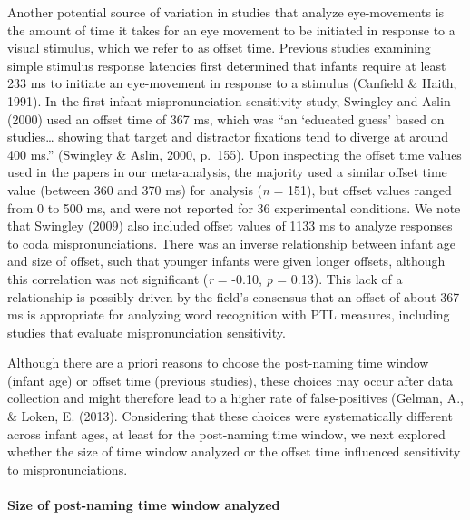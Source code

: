 \documentclass[man]{apa6}
\let\oldparagraph\paragraph
\renewcommand{\paragraph}[1]{\oldparagraph{#1}\mbox{}}
\theoremstyle{definition}
\theoremstyle{definition}
\theoremstyle{definition}
\theoremstyle{remark}
\begin{document}
Another potential source of variation in studies that analyze
eye-movements is the amount of time it takes for an eye movement to be
initiated in response to a visual stimulus, which we refer to as offset
time. Previous studies examining simple stimulus response latencies
first determined that infants require at least 233 ms to initiate an
eye-movement in response to a stimulus (Canfield \& Haith, 1991). In the
first infant mispronunciation sensitivity study, Swingley and Aslin
(2000) used an offset time of 367 ms, which was \enquote{an
\enquote{educated guess} based on studies\ldots{} showing that target
and distractor fixations tend to diverge at around 400 ms.} (Swingley \&
Aslin, 2000, p.~155). Upon inspecting the offset time values used in the
papers in our meta-analysis, the majority used a similar offset time
value (between 360 and 370 ms) for analysis (\emph{n} = 151), but offset
values ranged from 0 to 500 ms, and were not reported for 36
experimental conditions. We note that Swingley (2009) also included
offset values of 1133 ms to analyze responses to coda mispronunciations.
There was an inverse relationship between infant age and size of offset,
such that younger infants were given longer offsets, although this
correlation was not significant (\emph{r} = -0.10, \emph{p} = 0.13).
This lack of a relationship is possibly driven by the field's consensus
that an offset of about 367 ms is appropriate for analyzing word
recognition with PTL measures, including studies that evaluate
mispronunciation sensitivity.

Although there are a priori reasons to choose the post-naming time
window (infant age) or offset time (previous studies), these choices may
occur after data collection and might therefore lead to a higher rate of
false-positives (Gelman, A., \& Loken, E. (2013). Considering that these
choices were systematically different across infant ages, at least for
the post-naming time window, we next explored whether the size of time
window analyzed or the offset time influenced sensitivity to
mispronunciations.

\paragraph{Size of post-naming time window
analyzed}\label{size-of-post-naming-time-window-analyzed}
\end{document}
